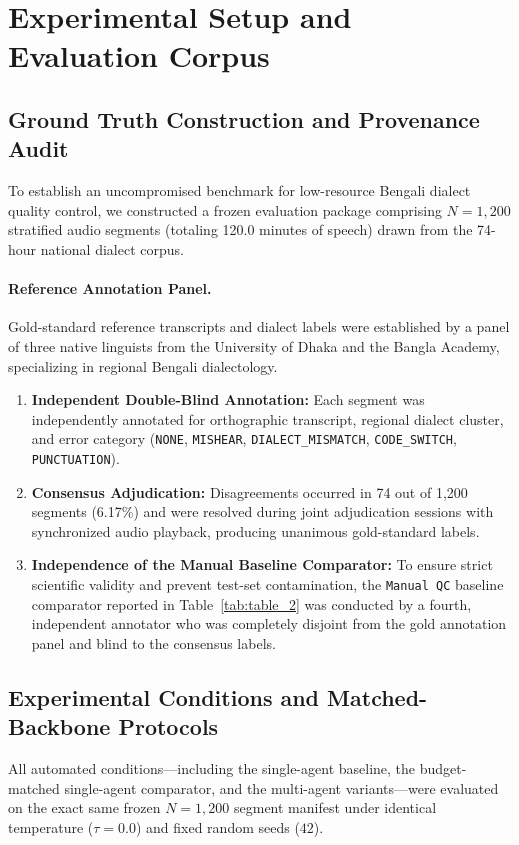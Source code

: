 \section{Experimental Setup and Evaluation Corpus}
\label{sec:experiments}

\subsection{Ground Truth Construction and Provenance Audit}
\label{subsec:ground_truth_provenance}
To establish an uncompromised benchmark for low-resource Bengali dialect quality control, we constructed a frozen evaluation package comprising $N=1{,}200$ stratified audio segments (totaling 120.0 minutes of speech) drawn from the 74-hour national dialect corpus.

\paragraph{Reference Annotation Panel.}
Gold-standard reference transcripts and dialect labels were established by a panel of three native linguists from the University of Dhaka and the Bangla Academy, specializing in regional Bengali dialectology. 
\begin{enumerate}
    \item \textbf{Independent Double-Blind Annotation:} Each segment was independently annotated for orthographic transcript, regional dialect cluster, and error category (\texttt{NONE}, \texttt{MISHEAR}, \texttt{DIALECT\_MISMATCH}, \texttt{CODE\_SWITCH}, \texttt{PUNCTUATION}).
    \item \textbf{Consensus Adjudication:} Disagreements occurred in 74 out of 1,200 segments (6.17\%) and were resolved during joint adjudication sessions with synchronized audio playback, producing unanimous gold-standard labels.
    \item \textbf{Independence of the Manual Baseline Comparator:} To ensure strict scientific validity and prevent test-set contamination, the \texttt{Manual QC} baseline comparator reported in Table~\ref{tab:table_2} was conducted by a fourth, independent annotator who was completely disjoint from the gold annotation panel and blind to the consensus labels.
\end{enumerate}

\subsection{Experimental Conditions and Matched-Backbone Protocols}
All automated conditions—including the single-agent baseline, the budget-matched single-agent comparator, and the multi-agent variants—were evaluated on the exact same frozen $N=1{,}200$ segment manifest under identical temperature ($\tau = 0.0$) and fixed random seeds ($42$).


